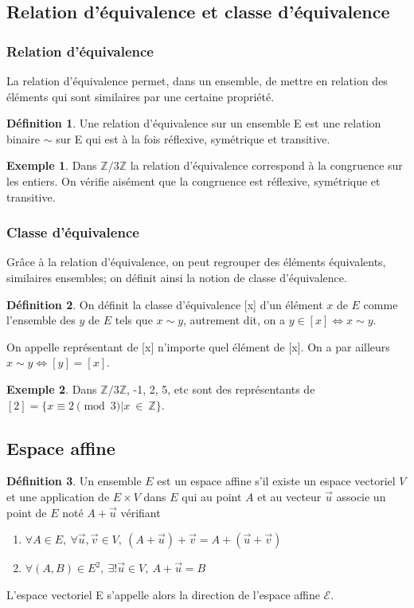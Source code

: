 \documentclass[a4paper,12pt,titlepage]{article}
\theoremstyle{plain}
\theoremstyle{definition}
\newtheorem{defi}{Définition}
\newtheorem{ex}{Exemple}
\begin{document}
\subsection{Relation d'équivalence et classe d'équivalence}
\subsubsection{Relation d'équivalence}
La relation d'équivalence permet, dans un ensemble, de mettre en relation des éléments qui sont similaires par une certaine propriété.
\begin{defi}
Une relation d'équivalence sur un ensemble E est une relation binaire $\sim$ sur E qui est à la fois réflexive, symétrique et transitive.
\end{defi}
\begin{ex}
Dans $\mathbb{Z}/3\mathbb{Z}$ la relation d'équivalence correspond à la congruence sur les entiers. On vérifie aisément que la congruence est réflexive, symétrique et transitive.
\end{ex}
\subsubsection{Classe d'équivalence}
Grâce à la relation d'équivalence, on peut regrouper des éléments équivalents, similaires ensembles; on définit ainsi la notion de classe d'équivalence.
\begin{defi}
On définit la classe d'équivalence [x] d'un élément $x$ de $E$ comme l'ensemble des $y$ de $E$ tels que $x \sim  y$, autrement dit, on a $y \in [x] \Leftrightarrow x \sim  y$.
\end{defi}
\noindent On appelle représentant de [x] n'importe quel élément de [x]. On a par ailleurs $x \sim  y \Leftrightarrow  [y] = [x]$.
\begin{ex}
Dans $\mathbb{Z}/3\mathbb{Z}$, -1, 2, 5, etc sont des représentants de $[2] = \{x \equiv 2 \pmod{3}|x~\in~\mathbb{Z}\}$.
\end{ex}

\subsection{Espace affine}
\begin{defi}
Un ensemble $E$ est un espace affine s'il existe un espace vectoriel $V$ et une application de $E \times V$ dans $E$ qui au point $A$ et au vecteur $\overrightarrow{u}$ associe un point de $E$ noté $A+\overrightarrow{u}$ vérifiant

\begin{enumerate}
\item $ \forall A \in E,~\forall \overrightarrow{u},\overrightarrow{v} \in V,~(A+\overrightarrow{u})+\overrightarrow{v}=A+(\overrightarrow{u}+\overrightarrow{v})$
\item $ \forall (A,B) \in E^2,~\exists!\overrightarrow{u} \in V,~ A+\overrightarrow{u}=B$
\end{enumerate}
L'espace vectoriel E s'appelle alors la direction de l'espace affine $\mathcal{E}$.
\end{defi}
\end{document}
